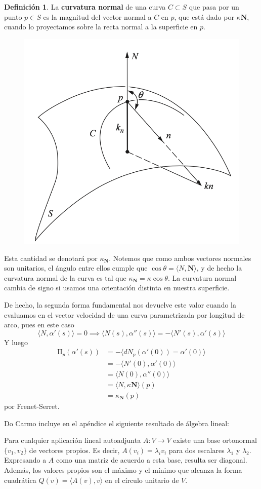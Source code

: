 \documentclass[spanish]{book}
\theoremstyle{definition}
\newtheorem*{defn}{Definición}
\begin{document}
\begin{defn}
	La \textbf{curvatura normal} de una curva $C\subset S$  que pasa por un punto $p\in S$ es la magnitud del vector normal a $C$ en $p$, que está dado por $\kappa\mathbf{N}$, cuando lo proyectamos sobre la recta normal a la superficie en $p$.
\end{defn}
\begin{figure}
	\centering
	\includegraphics[width=0.5\linewidth]{gauss2}
\end{figure}
Esta cantidad se denotará por $\kappa_\mathbf{N}$. Notemos que como ambos vectores normales son unitarios, el ángulo entre ellos cumple que $\cos\theta=\langle N,\mathbf{{N}}\rangle$, y de hecho la curvatura normal de la curva es tal que $\kappa_\mathbf{{N}}=\kappa\cos\theta$. La curvatura normal cambia de signo si usamos una orientación distinta en nuestra superficie.

De hecho, la segunda forma fundamental nos devuelve este valor cuando la evaluamos en el vector velocidad de una curva parametrizada por longitud de arco, pues en este caso
\[\langle N,\alpha'(s)\rangle=0\implies\langle N(s),\alpha''(s)\rangle=-\langle N'(s),\alpha'(s)\rangle\]
Y luego
\begin{align*}
	\mathrm{I\!I}_p(\alpha'(s))&=-\langle dN_p(\alpha'(0))=\alpha'(0)\rangle\\
	&=-\langle N'(0),\alpha'(0)\rangle\\
	&=\langle N(0),\alpha''(0)\rangle\\
	&=\langle N,\kappa\mathbf{N}\rangle(p)\\
	&=\kappa_\mathbf{N}(p)
\end{align*}
por Frenet-Serret.

Do Carmo incluye en el apéndice el siguiente resultado de álgebra lineal:

Para cualquier aplicación lineal autoadjunta $A:V\to V$ existe una base ortonormal $\{v_1,v_2\}$ de vectores propios. Es decir, $A(v_i)=\lambda_iv_i$ para dos escalares $\lambda_1$ y $\lambda_2$. Expresando a $A$ como una matriz de acuerdo a esta base, resulta ser diagonal. Además, los valores propios son el máximo y el mínimo que alcanza la forma cuadrática $Q(v)=\langle A(v),v\rangle$ en el círculo unitario de $V$.
\end{document}

